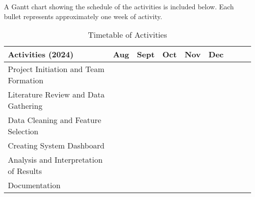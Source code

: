 A Gantt chart showing the schedule of the activities is included below. Each bullet represents approximately one week of activity.

\newcommand{\weekone}{\textbullet}
\newcommand{\weektwo}{\textbullet \textbullet}
\newcommand{\weekthree}{\textbullet \textbullet \textbullet}
\newcommand{\weekfour}{\textbullet \textbullet \textbullet \textbullet}

\begin{table}[ht]
	\centering
	\caption{Timetable of Activities} \vspace{0.25em}
	\begin{tabular}{|p{2in}|c|c|c|c|c|c|c|c|} \hline
		Activities (2024) & Aug & Sept & Oct & Nov & Dec \\ \hline
		Project Initiation and Team Formation & \weektwo & & & & \\ \hline
		Literature Review and Data Gathering & \weektwo & \weekfour & & & \\ \hline
		Data Cleaning and Feature Selection & & \weektwo & & \weekone & \\ \hline
		
		
		Creating System Dashboard & & \weektwo & \weekfour & \weekone & \\ \hline
		Analysis and Interpretation of Results & & & \weekone & & \\ \hline
		Documentation & & \weekone & \weekfour & \weekone & \\ \hline
	\end{tabular}
	\label{tab:timetableactivities}
\end{table}
